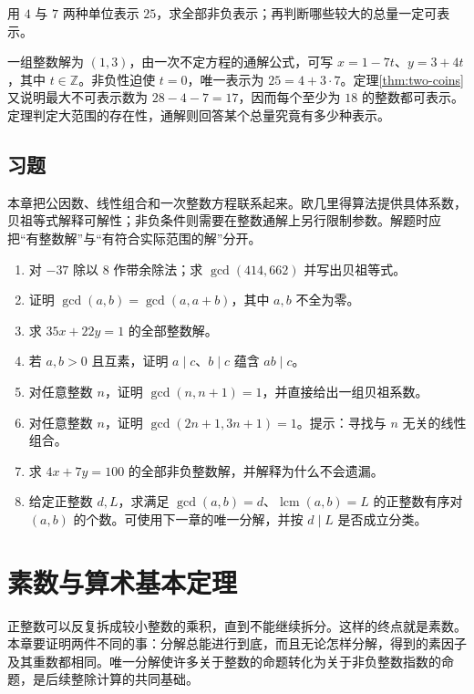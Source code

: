 \documentclass[UTF8,12pt,a4paper,fontset=fandol]{ctexbook}
\begin{document}
\begin{example}[存在性判据与实际求解]
用 $4$ 与 $7$ 两种单位表示 $25$，求全部非负表示；再判断哪些较大的总量一定可表示。
\end{example}
\begin{solve}
一组整数解为 $(1,3)$，由一次不定方程的通解公式，可写 $x=1-7t$、$y=3+4t$，其中 $t\in\mathbb Z$。非负性迫使 $t=0$，唯一表示为 $25=4+3\cdot7$。定理\ref{thm:two-coins}又说明最大不可表示数为 $28-4-7=17$，因而每个至少为 $18$ 的整数都可表示。定理判定大范围的存在性，通解则回答某个总量究竟有多少种表示。
\end{solve}

\section{习题}

本章把公因数、线性组合和一次整数方程联系起来。欧几里得算法提供具体系数，贝祖等式解释可解性；非负条件则需要在整数通解上另行限制参数。解题时应把“有整数解”与“有符合实际范围的解”分开。

\begin{enumerate}
 \item 对 $-37$ 除以 $8$ 作带余除法；求 $\gcd(414,662)$ 并写出贝祖等式。
 \item 证明 $\gcd(a,b)=\gcd(a,a+b)$，其中 $a,b$ 不全为零。
 \item 求 $35x+22y=1$ 的全部整数解。
 \item 若 $a,b>0$ 且互素，证明 $a\mid c$、$b\mid c$ 蕴含 $ab\mid c$。
 \item\label{ex:div-consecutive} 对任意整数 $n$，证明 $\gcd(n,n+1)=1$，并直接给出一组贝祖系数。
 \item\label{ex:div-combinations} 对任意整数 $n$，证明 $\gcd(2n+1,3n+1)=1$。提示：寻找与 $n$ 无关的线性组合。
 \item\label{ex:div-nonnegative} 求 $4x+7y=100$ 的全部非负整数解，并解释为什么不会遗漏。
 \item\label{ex:div-gcd-lcm-count} 给定正整数 $d,L$，求满足 $\gcd(a,b)=d$、$\operatorname{lcm}(a,b)=L$ 的正整数有序对 $(a,b)$ 的个数。可使用下一章的唯一分解，并按 $d\mid L$ 是否成立分类。
\end{enumerate}

\chapter{素数与算术基本定理}
\label{ch:primes}

正整数可以反复拆成较小整数的乘积，直到不能继续拆分。这样的终点就是素数。本章要证明两件不同的事：分解总能进行到底，而且无论怎样分解，得到的素因子及其重数都相同。唯一分解使许多关于整数的命题转化为关于非负整数指数的命题，是后续整除计算的共同基础。
\end{document}
